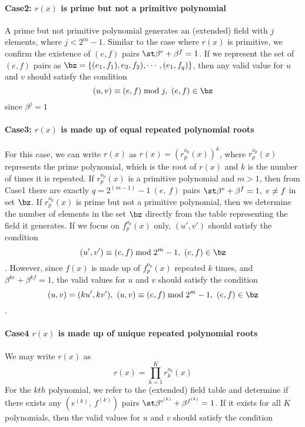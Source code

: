 \paragraph{Case2: $r(x)$ is prime but not a primitive polynomial\newline}
A prime but not primitive polynomial generates an (extended) field with $j$ elements, where $j<2^m-1$. Similar to the case where $r(x)$ is primitive, we confirm the existence of $(e,f)$ pairs $ \st \beta^e + \beta^f =1$. 
If we represent the set of $(e,f)$ pairs as 
$\bz=\{ (e_1,f_1) , e_2,f_2),\cdots,(e_1,f_q)\} $, then any valid value for $u$ and $v$ should satisfy the condition
$$(u,v) \equiv (e,f) \bmod j,~(e,f)\in \bz$$ since $\beta^{j}=1$

\paragraph{Case3: $r(x)$ is made up of equal repeated polynomial roots\newline}
For this case, we can write $r(x)$ as 
$r(x)=(r^{o_p}_p(x))^k$, where $r^{o_p}_p(x)$ represents the prime polynomial, which is the root of $r(x)$ and $k$ is the number of times it is repeated. If $r^{o_p}_p(x)$ is a primitive polynomial and $m>1$, then from Case1 there are exactly $q=2^{(m-1)}-1~(e,~f)$ pairs $\st \beta^e+\beta^f=1,~e \neq f$ in set $\bz$. 
If $r^{o_p}_p(x)$ is prime but not a primitive polynomial, then we determine the number of elements in the set $\bz$ directly from the table representing the field it generates.
 If we focus on $f^{o_p}_p(x)$ only, $(u',v')$ should satisfy the condition$$ (u',v') \equiv (e,f)\bmod 2^{m}-1,~(e, f) \in \bz$$. However, since $f(x)$ is made up of $f^{o_p}_p(x)$ repeated $k$ times, and $\beta^{ke}+\beta^{kf}=1$, the valid values for $u$ and $v$
 should satisfy the condition
 $$(u,v)=(ku',kv'),~(u,v) \equiv (e,f)\bmod 2^{m}-1,~(e, f) \in \bz $$.

\paragraph{Case4 $r(x)$ is made up of unique repeated polynomial roots\newline}
We may write $r(x)$ as $$r(x)=\prod_{k=1}^{K}r^{o_k}_k(x)$$ 
For the $kth$ polynomial, we refer to the (extended) field table and determine if there exists any $(e^{(k)},~f^{(k)})$ pairs $\st \beta^{e^{(k)}}+\beta^{f^{(k)}}=1$. If it exists for all $K$ polynomials, then the valid values for $u$ and $v$
 should satisfy the condition

